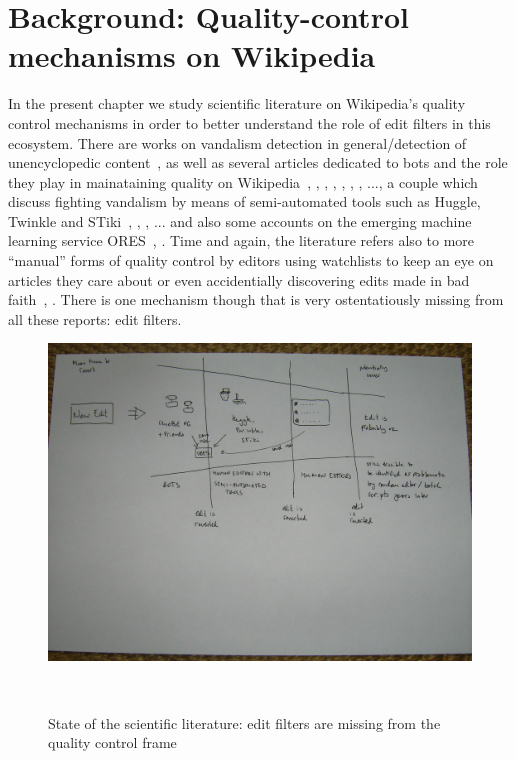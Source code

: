 \chapter{Background: Quality-control mechanisms on Wikipedia}
\label{chap:background}

In the present chapter we study scientific literature on Wikipedia's quality control mechanisms in order to better understand the role of edit filters in this ecosystem.
There are works on vandalism detection in general/detection of unencyclopedic content~\cite{PotSteGer2008}, %
as well as several articles dedicated to bots and the role they play in mainataining quality on Wikipedia~\cite{GeiHal2013}, \cite{Geiger2014}, \cite{GeiHal2017}, \cite{GeiRib2010}, \cite{HalRied2012}, \cite{Livingstone2016}, \cite{MueDoHer2013}, \cite{MuellerBirn2014}...,
a couple which discuss fighting vandalism by means of semi-automated tools such as Huggle, Twinkle and STiki~\cite{GeiRib2010}, \cite{HalRied2012}, \cite{WestKanLee2010}, \cite{GeiHal2013} ...
and also some accounts on the emerging machine learning service ORES~\cite{HalTar2015}, \cite{HalGeiMorSarWig2018}.
Time and again, the literature refers also to more ``manual'' forms of quality control by editors using watchlists to keep an eye on articles they care about or even accidentially discovering edits made in bad faith~\cite{Livingstone2016}, \cite{AstHal2018}.
There is one mechanism though that is very ostentatiously missing from all these reports: edit filters.

\begin{figure}
\centering
  \includegraphics[width=0.9\columnwidth]{pics/funnel-diagramm-no-filters.JPG}
  \caption{State of the scientific literature: edit filters are missing from the quality control frame}~\label{fig:funnel-no-filters}
\end{figure}


